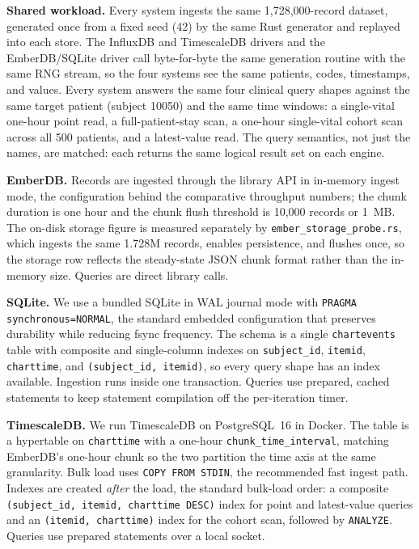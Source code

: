 \documentclass[journal]{IEEEtran}
\begin{document}
\textbf{Shared workload.} Every system ingests the same 1{,}728{,}000-record dataset, generated once from a fixed seed (42) by the same Rust generator and replayed into each store. The InfluxDB and TimescaleDB drivers and the EmberDB/SQLite driver call byte-for-byte the same generation routine with the same RNG stream, so the four systems see the same patients, codes, timestamps, and values. Every system answers the same four clinical query shapes against the same target patient (subject 10050) and the same time windows: a single-vital one-hour point read, a full-patient-stay scan, a one-hour single-vital cohort scan across all 500 patients, and a latest-value read. The query semantics, not just the names, are matched: each returns the same logical result set on each engine.

\textbf{EmberDB.} Records are ingested through the library API in in-memory ingest mode, the configuration behind the comparative throughput numbers; the chunk duration is one hour and the chunk flush threshold is 10{,}000 records or 1~MB. The on-disk storage figure is measured separately by \texttt{ember\_storage\_probe.rs}, which ingests the same 1.728M records, enables persistence, and flushes once, so the storage row reflects the steady-state JSON chunk format rather than the in-memory size. Queries are direct library calls.

\textbf{SQLite.} We use a bundled SQLite in WAL journal mode with \texttt{PRAGMA synchronous=NORMAL}, the standard embedded configuration that preserves durability while reducing fsync frequency. The schema is a single \texttt{chartevents} table with composite and single-column indexes on \texttt{subject\_id}, \texttt{itemid}, \texttt{charttime}, and \texttt{(subject\_id, itemid)}, so every query shape has an index available. Ingestion runs inside one transaction. Queries use prepared, cached statements to keep statement compilation off the per-iteration timer.

\textbf{TimescaleDB.} We run TimescaleDB on PostgreSQL~16 in Docker. The table is a hypertable on \texttt{charttime} with a one-hour \texttt{chunk\_time\_interval}, matching EmberDB's one-hour chunk so the two partition the time axis at the same granularity. Bulk load uses \texttt{COPY FROM STDIN}, the recommended fast ingest path. Indexes are created \emph{after} the load, the standard bulk-load order: a composite \texttt{(subject\_id, itemid, charttime DESC)} index for point and latest-value queries and an \texttt{(itemid, charttime)} index for the cohort scan, followed by \texttt{ANALYZE}. Queries use prepared statements over a local socket.
\end{document}
